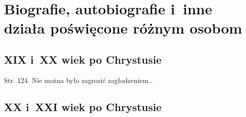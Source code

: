 \documentclass[a4paper,11pt]{article}
\begin{document}
\vspace{\spaceOne}










\newpage
\section{Biografie, autobiografie i~inne działa poświęcone różnym osobom}

\vspace{\spaceTwo}



\subsection{XIX i~XX wiek po Chrystusie}

\vspace{\spaceThree}







Str. 124. Nie można było zagrozić zagłodzeniem\ldots


\vspace{\spaceTwo}










\subsection{XX i~XXI wiek po Chrystusie}

\vspace{\spaceThree}





\end{document}

